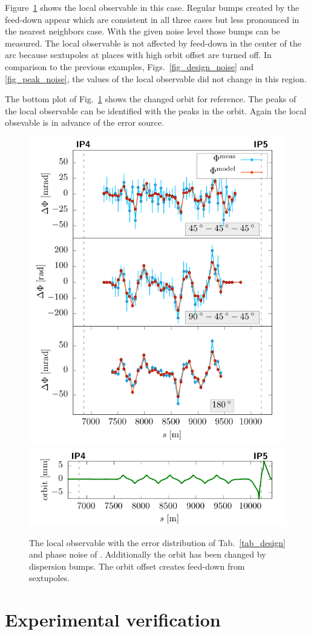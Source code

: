 Figure~\ref{fig_disp_noise} shows the local observable in this case. Regular bumps created by the
feed-down appear which are consistent in all three cases but less pronounced in the nearest neighbors case.
With the given noise level those bumps can be measured.
The local observable is not affected by feed-down in the center of the arc because sextupoles at places
with high orbit offset are turned off.
In comparison to the previous examples, Figs.~\ref{fig_design_noise} and \ref{fig_peak_noise}, the
values of the local observable did not change in this region.

The bottom plot of Fig.~\ref{fig_disp_noise} shows the changed orbit for reference.
The peaks of the local observable can be identified with the peaks in the orbit.
Again the local obsevable is in 
advance of the error source.
%
\begin{figure}[t]
  \centering
  \includegraphics[width=.6\linewidth]{sim_disp}\\
  \includegraphics[width=.6\linewidth]{sim_orbit_x_noise_disp}
  \caption{The local observable with the error distribution of Tab.~\ref{tab_design} and phase noise
    of \noiserms. Additionally the orbit has been changed by dispersion bumps. The orbit offset creates
  feed-down from sextupoles.}
  \label{fig_disp_noise}
\end{figure}
%
\section{Experimental verification}
\label{sec:measurements}

